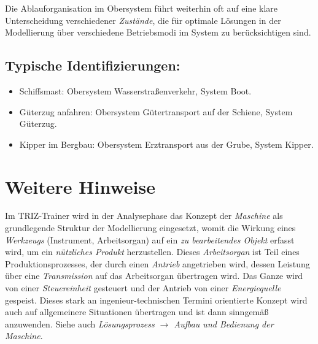 \documentclass[11pt,a4paper]{article}
\begin{document}
Die Ablauforganisation im Obersystem führt weiterhin oft auf eine klare
Unterscheidung verschiedener \emph{Zustände}, die für optimale Lösungen in der
Modellierung über verschiedene Betriebsmodi im System zu berücksichtigen sind.

\subsection*{Typische Identifizierungen:}
\begin{itemize}
\item Schiffsmast: Obersystem Wasserstraßenverkehr, System Boot.
\item Güterzug anfahren: Obersystem Gütertransport auf der Schiene, System
  Güterzug. 
\item Kipper im Bergbau: Obersystem Erztransport aus der Grube, System
  Kipper. 
\end{itemize}

\section{Weitere Hinweise}

Im TRIZ-Trainer wird in der Analysephase das Konzept der \emph{Maschine} als
grundlegende Struktur der Modellierung eingesetzt, womit die Wirkung eines
\emph{Werkzeugs} (Instrument, Arbeitsorgan) auf ein \emph{zu bearbeitendes
  Objekt} erfasst wird, um ein \emph{nützliches Produkt} herzustellen.  Dieses
\emph{Arbeitsorgan} ist Teil eines Produktionsprozesses, der durch einen
\emph{Antrieb} angetrieben wird, dessen Leistung über eine \emph{Transmission}
auf das Arbeitsorgan übertragen wird.  Das Ganze wird von einer
\emph{Steuereinheit} gesteuert und der Antrieb von einer \emph{Energiequelle}
gespeist.  Dieses stark an ingenieur-technischen Termini orientierte Konzept
wird auch auf allgemeinere Situationen übertragen und ist dann sinngemäß
anzuwenden.  Siehe auch \emph{Lösungsprozess $\to$ Aufbau und Bedienung der
  Maschine}.
\end{document}
